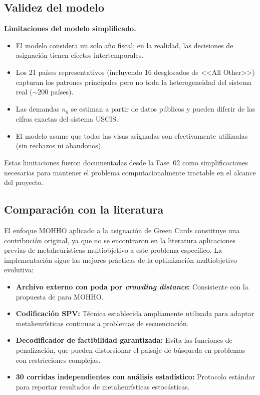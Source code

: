 \documentclass[12pt,letterpaper]{article}
\begin{document}
\subsection{Validez del modelo}

\begin{restrictionbox}
\textbf{Limitaciones del modelo simplificado.}
\begin{itemize}
    \item El modelo considera un solo año fiscal; en la realidad, las decisiones de asignación tienen efectos intertemporales.
    \item Los 21 países representativos (incluyendo 16 desglosados de <<All Other>>) capturan los patrones principales pero no toda la heterogeneidad del sistema real ($\sim$200 países).
    \item Las demandas $n_g$ se estiman a partir de datos públicos y pueden diferir de las cifras exactas del sistema USCIS.
    \item El modelo asume que todas las visas asignadas son efectivamente utilizadas (sin rechazos ni abandonos).
\end{itemize}
Estas limitaciones fueron documentadas desde la Fase~02 como simplificaciones necesarias para mantener el problema computacionalmente tractable en el alcance del proyecto.
\end{restrictionbox}

\subsection{Comparación con la literatura}

El enfoque MOHHO aplicado a la asignación de Green Cards constituye una contribución original, ya que no se encontraron en la literatura aplicaciones previas de metaheurísticas multiobjetivo a este problema específico. La implementación sigue las mejores prácticas de la optimización multiobjetivo evolutiva:

\begin{itemize}
    \item \textbf{Archivo externo con poda por \textit{crowding distance}:} Consistente con la propuesta de \textcite{kusoglu2020} para MOHHO.
    \item \textbf{Codificación SPV:} Técnica establecida \parencite{bean1994} ampliamente utilizada para adaptar metaheurísticas continuas a problemas de secuenciación.
    \item \textbf{Decodificador de factibilidad garantizada:} Evita las funciones de penalización, que pueden distorsionar el paisaje de búsqueda en problemas con restricciones complejas.
    \item \textbf{30 corridas independientes con análisis estadístico:} Protocolo estándar para reportar resultados de metaheurísticas estocásticas.
\end{itemize}
\end{document}
